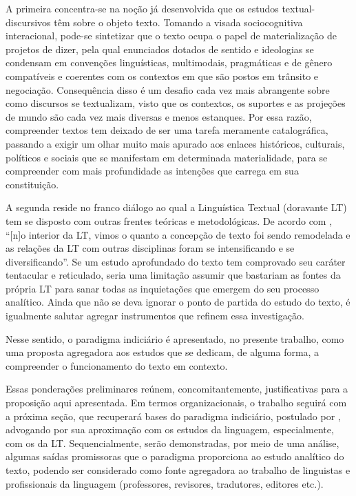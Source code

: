 \documentclass[portuguese]{textolivre}
\begin{document}
A primeira concentra-se na noção já desenvolvida que os estudos textual-discursivos têm sobre o objeto texto. Tomando a visada sociocognitiva interacional, pode-se sintetizar que o texto ocupa o papel de materialização de projetos de dizer, pela qual enunciados dotados de sentido e ideologias se condensam em convenções linguísticas, multimodais, pragmáticas e de gênero compatíveis e coerentes com os contextos em que são postos em trânsito e negociação. Consequência disso é um desafio cada vez mais abrangente sobre como discursos se textualizam, visto que os contextos, os suportes e as projeções de mundo são cada vez mais diversas e menos estanques. Por essa razão, compreender textos tem deixado de ser uma tarefa meramente catalográfica, passando a exigir um olhar muito mais apurado aos enlaces históricos, culturais, políticos e sociais que se manifestam em determinada materialidade, para se compreender com mais profundidade as intenções que carrega em sua constituição.

A segunda reside no franco diálogo ao qual a Linguística Textual (doravante LT) tem se disposto com outras frentes teóricas e metodológicas. De acordo com \textcite[p. 18]{elias2021texto}, “[n]o interior da LT, vimos o quanto a concepção de texto foi sendo remodelada e as relações da LT com outras disciplinas foram se intensificando e se diversificando”. Se um estudo aprofundado do texto tem comprovado seu caráter tentacular e reticulado, seria uma limitação assumir que bastariam as fontes da própria LT para sanar todas as inquietações que emergem do seu processo analítico. Ainda que não se deva ignorar o ponto de partida do estudo do texto, é igualmente salutar agregar instrumentos que refinem essa investigação.

Nesse sentido, o paradigma indiciário é apresentado, no presente trabalho, como uma proposta agregadora aos estudos que se dedicam, de alguma forma, a compreender o funcionamento do texto em contexto.

Essas ponderações preliminares reúnem, concomitantemente, justificativas para a proposição aqui apresentada. Em termos organizacionais, o trabalho seguirá com a próxima seção, que recuperará bases do paradigma indiciário, postulado por \textcite{ginzburg1986mitos,ginzburg2007fio}, advogando por sua aproximação com os estudos da linguagem, especialmente, com os da LT. Sequencialmente, serão demonstradas, por meio de uma análise, algumas saídas promissoras que o paradigma proporciona ao estudo analítico do texto, podendo ser considerado como fonte agregadora ao trabalho de linguistas e profissionais da linguagem (professores, revisores, tradutores, editores etc.).
\end{document}
